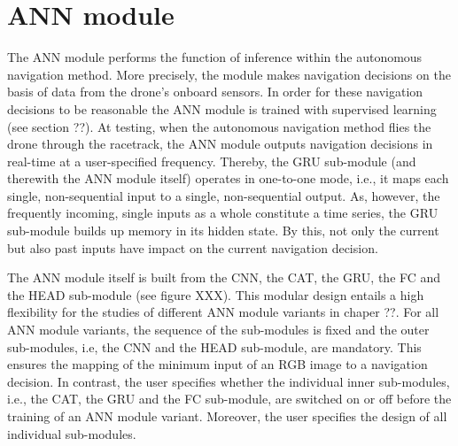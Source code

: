 \section{ANN module} \label{sec:ann_module}
The ANN module performs the function of inference
within the autonomous navigation method.
More precisely, the module makes navigation decisions
on the basis of data from the drone's onboard sensors.
In order for these navigation decisions to be reasonable
the ANN module is trained with supervised learning (see section ??).
At testing, 
when the autonomous navigation method flies the drone through the racetrack,
the ANN module outputs navigation decisions in real-time at a user-specified frequency.
Thereby, the GRU sub-module (and therewith the ANN module itself)
operates in one-to-one mode,
i.e., it maps each single, non-sequential input to a single, non-sequential output.
As, however, the frequently incoming, single inputs as a whole constitute a time series,
the GRU sub-module builds up memory in its hidden state.
By this, not only the current but also 
past inputs have impact on the current navigation decision.


The ANN module itself is built 
from the CNN, the CAT, the GRU, the FC and the HEAD sub-module
(see figure XXX).
This modular design entails a high flexibility for the studies
of different ANN module variants in chaper ??.
For all ANN module variants,
the sequence of the sub-modules is fixed
and the outer sub-modules, i.e, the CNN and the HEAD sub-module,
are mandatory.
This ensures the mapping 
of the minimum input of an RGB image to a navigation decision.
In contrast, the user specifies whether
the individual inner sub-modules,
i.e., the CAT, the GRU and the FC sub-module,
are switched on or off
before the training of an ANN module variant.
Moreover, the user specifies the design of all individual sub-modules.



